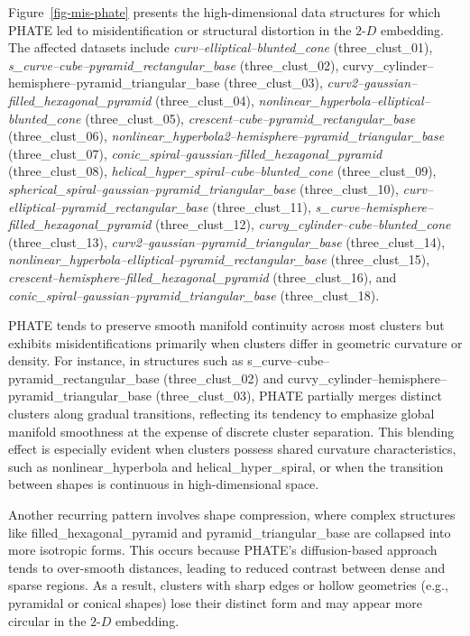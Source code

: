\documentclass[
  11pt,
  a4paper,
]{report}
\newcommand\gD{$2\text{-}D$}
\begin{document}
Figure~\ref{fig-mis-phate} presents the high-dimensional data structures
for which PHATE led to misidentification or structural distortion in the
\gD{} embedding. The affected datasets include
\emph{curv--elliptical--blunted\_cone} (three\_clust\_01),
\emph{s\_curve--cube--pyramid\_rectangular\_base} (three\_clust\_02),
curvy\_cylinder--hemisphere--pyramid\_triangular\_base
(three\_clust\_03), \emph{curv2--gaussian--filled\_hexagonal\_pyramid}
(three\_clust\_04),
\emph{nonlinear\_hyperbola--elliptical--blunted\_cone}
(three\_clust\_05), \emph{crescent--cube--pyramid\_rectangular\_base}
(three\_clust\_06),
\emph{nonlinear\_hyperbola2--hemisphere--pyramid\_triangular\_base}
(three\_clust\_07),
\emph{conic\_spiral--gaussian--filled\_hexagonal\_pyramid}
(three\_clust\_08), \emph{helical\_hyper\_spiral--cube--blunted\_cone}
(three\_clust\_09),
\emph{spherical\_spiral--gaussian--pyramid\_triangular\_base}
(three\_clust\_10), \emph{curv--elliptical--pyramid\_rectangular\_base}
(three\_clust\_11),
\emph{s\_curve--hemisphere--filled\_hexagonal\_pyramid}
(three\_clust\_12), \emph{curvy\_cylinder--cube--blunted\_cone}
(three\_clust\_13), \emph{curv2--gaussian--pyramid\_triangular\_base}
(three\_clust\_14),
\emph{nonlinear\_hyperbola--elliptical--pyramid\_rectangular\_base}
(three\_clust\_15),
\emph{crescent--hemisphere--filled\_hexagonal\_pyramid}
(three\_clust\_16), and
\emph{conic\_spiral--gaussian--pyramid\_triangular\_base}
(three\_clust\_18).

PHATE tends to preserve smooth manifold continuity across most clusters
but exhibits misidentifications primarily when clusters differ in
geometric curvature or density. For instance, in structures such as
s\_curve--cube--pyramid\_rectangular\_base (three\_clust\_02) and
curvy\_cylinder--hemisphere--pyramid\_triangular\_base
(three\_clust\_03), PHATE partially merges distinct clusters along
gradual transitions, reflecting its tendency to emphasize global
manifold smoothness at the expense of discrete cluster separation. This
blending effect is especially evident when clusters possess shared
curvature characteristics, such as nonlinear\_hyperbola and
helical\_hyper\_spiral, or when the transition between shapes is
continuous in high-dimensional space.

Another recurring pattern involves shape compression, where complex
structures like filled\_hexagonal\_pyramid and pyramid\_triangular\_base
are collapsed into more isotropic forms. This occurs because PHATE's
diffusion-based approach tends to over-smooth distances, leading to
reduced contrast between dense and sparse regions. As a result, clusters
with sharp edges or hollow geometries (e.g., pyramidal or conical
shapes) lose their distinct form and may appear more circular in the
\gD{} embedding.
\end{document}
